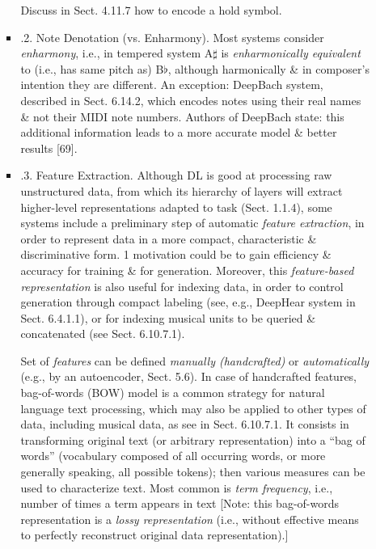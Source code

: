 \documentclass{article}
\begin{document}
\begin{itemize}
\begin{itemize}
\begin{itemize}
			Discuss in Sect. 4.11.7 how to encode a hold symbol.
			\item {.2. Note Denotation (vs. Enharmony).} Most systems consider {\it enharmony}, i.e., in tempered system A$\sharp$ is {\it enharmonically equivalent} to (i.e., has same pitch as) B$\flat$, although harmonically \& in composer's intention they are different. An exception: DeepBach system, described in Sect. 6.14.2, which encodes notes using their real names \& not their MIDI note numbers. Authors of DeepBach state: this additional information leads to a more accurate model \& better results [69].
			\item {.3. Feature Extraction.} Although DL is good at processing raw unstructured data, from which its hierarchy of layers will extract higher-level representations adapted to task (Sect. 1.1.4), some systems include a preliminary step of automatic {\it feature extraction}, in order to represent data in a more compact, characteristic \& discriminative form. 1 motivation could be to gain efficiency \& accuracy for training \& for generation. Moreover, this {\it feature-based representation} is also useful for indexing data, in order to control generation through compact labeling (see, e.g., DeepHear system in Sect. 6.4.1.1), or for indexing musical units to be queried \& concatenated (see Sect. 6.10.7.1).
			
			Set of {\it features} can be defined {\it manually (handcrafted)} or {\it automatically} (e.g., by an autoencoder, Sect. 5.6). In case of handcrafted features, bag-of-words (BOW) model is a common strategy for natural language text processing, which may also be applied to other types of data, including musical data, as see in Sect. 6.10.7.1. It consists in transforming original text (or arbitrary representation) into a ``bag of words'' (vocabulary composed of all occurring words, or more generally speaking, all possible tokens); then various measures can be used to characterize text. Most common is {\it term frequency}, i.e., number of times a term appears in text [Note: this bag-of-words representation is a {\it lossy representation} (i.e., without effective means to perfectly reconstruct original data representation).]
			

\end{itemize}
\end{itemize}
\end{itemize}
\end{document}

